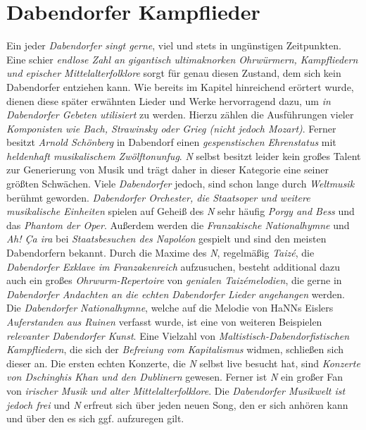 \section{{Dabendorfer Kampflieder}}\label{DabendorferKampflieder}
Ein jeder \textit{Dabendorfer singt gerne}, viel und stets in ungünstigen Zeitpunkten. Eine schier \textit{endlose Zahl an gigantisch ultimaknorken Ohrwürmern, Kampfliedern und epischer Mittelalterfolklore} sorgt für genau diesen Zustand, dem sich kein Dabendorfer entziehen kann. Wie bereits im Kapitel  hinreichend erörtert wurde, dienen diese später erwähnten Lieder und Werke hervorragend dazu, um \textit{in Dabendorfer Gebeten utilisiert} zu werden. Hierzu zählen die Ausführungen vieler \textit{Komponisten wie Bach, Strawinsky oder Grieg (nicht jedoch Mozart)}. Ferner besitzt \textit{Arnold Schönberg} in Dabendorf einen \textit{gespenstischen Ehrenstatus} mit \textit{heldenhaft musikalischem Zwölftonunfug}. \textit{N} selbst besitzt leider kein großes Talent zur Generierung von Musik und trägt daher in dieser Kategorie eine seiner größten Schwächen. Viele \textit{Dabendorfer} jedoch, sind schon lange durch \textit{Weltmusik} berühmt geworden. \textit{Dabendorfer Orchester, die Staatsoper und weitere musikalische Einheiten} spielen auf Geheiß des \textit{N} sehr häufig \textit{Porgy and Bess} und das \textit{Phantom der Oper}. Außerdem werden die \textit{Franzakische Nationalhymne} und \textit{Ah! Ça ira} bei \textit{Staatsbesuchen des Napoléon} gespielt und sind den meisten Dabendorfern bekannt. Durch die Maxime des \textit{N}, regelmäßig \textit{Taizé}, die \textit{Dabendorfer Exklave im Franzakenreich} aufzusuchen, besteht additional dazu auch ein großes \textit{Ohrwurm-Repertoire} von \textit{genialen Taizémelodien}, die gerne in \textit{Dabendorfer Andachten an die echten Dabendorfer Lieder angehangen} werden. Die \textit{Dabendorfer Nationalhymne}, welche auf die Melodie von HaNNs Eislers \textit{Auferstanden aus Ruinen} verfasst wurde, ist eine von weiteren Beispielen \textit{relevanter Dabendorfer Kunst}. Eine Vielzahl von \textit{Maltistisch-Dabendorfistischen Kampfliedern}, die sich der \textit{Befreiung vom Kapitalismus} widmen, schließen sich dieser an. Die ersten echten Konzerte, die \textit{N} selbst live besucht hat, sind \textit{Konzerte von Dschinghis Khan und den Dublinern} gewesen. Ferner ist \textit{N} ein großer Fan von \textit{irischer Musik und alter Mittelalterfolklore}. Die \textit{Dabendorfer Musikwelt ist jedoch frei} und \textit{N} erfreut sich über jeden neuen Song, den er sich anhören kann und über den es sich ggf. aufzuregen gilt.\\
